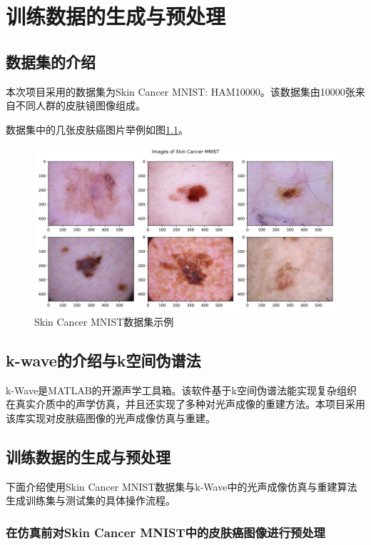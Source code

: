 \chapter{训练数据的生成与预处理}
\label{cha:usage-example}

\section{数据集的介绍}
本次项目采用的数据集为Skin Cancer MNIST: HAM10000。该数据集由10000张来自不同人群的皮肤镜图像组成。

数据集中的几张皮肤癌图片举例如图\ref{img401}。

\begin{figure}[h]
	\centering
	\includegraphics[width=0.9\columnwidth]{image/chap04/img401.png}
	\caption{Skin Cancer MNIST数据集示例}
	\label{img401}
\end{figure}

\section{k-wave的介绍与k空间伪谱法}
k-Wave是MATLAB的开源声学工具箱。该软件基于k空间伪谱法能实现复杂组织在真实介质中的声学仿真，并且还实现了多种对光声成像的重建方法。本项目采用该库实现对皮肤癌图像的光声成像仿真与重建。

\section{训练数据的生成与预处理}
下面介绍使用Skin Cancer MNIST数据集与k-Wave中的光声成像仿真与重建算法生成训练集与测试集的具体操作流程。

\subsection{在仿真前对Skin Cancer MNIST中的皮肤癌图像进行预处理}

